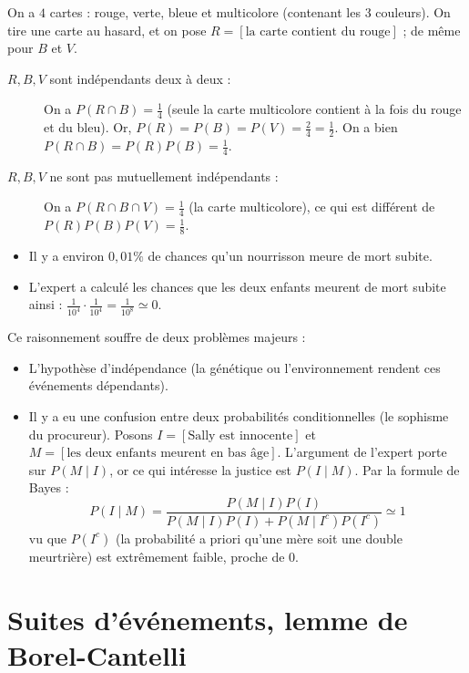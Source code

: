 \begin{exemple}
    On a $4$ cartes : rouge, verte, bleue et multicolore (contenant les 3 couleurs). On tire une carte au hasard, et on pose $R = [\text{la carte contient du rouge}]$ ; de même pour $B$ et $V$.
    \begin{description}
        \item[$R, B, V$ sont indépendants deux à deux :] On a $P(R\cap B) = \frac{1}{4}$ (seule la carte multicolore contient à la fois du rouge et du bleu). Or, $P(R) = P(B) = P(V) = \frac{2}{4} = \frac{1}{2}$. On a bien $P(R\cap B) = P(R)P(B) = \frac{1}{4}$.
        \item[$R, B, V$ ne sont pas mutuellement indépendants :] On a $P(R\cap B\cap V) = \frac{1}{4}$ (la carte multicolore), ce qui est différent de $P(R)P(B)P(V) = \frac{1}{8}$.
    \end{description}
\end{exemple}

\begin{exemple}
    \begin{itemize}
        \item Il y a environ $0{,}01\%$ de chances qu'un nourrisson meure de mort subite.
        \item L'expert a calculé les chances que les deux enfants meurent de mort subite ainsi : $\frac{1}{10^4} \cdot \frac{1}{10^4} = \frac{1}{10^8} \simeq 0$.
    \end{itemize}
    Ce raisonnement souffre de deux problèmes majeurs :
    \begin{itemize}
        \item L'hypothèse d'indépendance (la génétique ou l'environnement rendent ces événements dépendants).
        \item Il y a eu une confusion entre deux probabilités conditionnelles (le sophisme du procureur). Posons $I = [\text{Sally est innocente}]$ et $M = [\text{les deux enfants meurent en bas âge}]$. L'argument de l'expert porte sur $P(M\mid I)$, or ce qui intéresse la justice est $P(I\mid M)$. Par la formule de Bayes :
        \[
        P(I\mid M ) = \frac{P(M\mid I)P(I)}{P(M\mid I)P(I) + P(M\mid I^c)P(I^c)} \simeq 1
        \]
        vu que $P(I^c)$ (la probabilité a priori qu'une mère soit une double meurtrière) est extrêmement faible, proche de $0$.
    \end{itemize}
\end{exemple}

\section{Suites d'événements, lemme de Borel-Cantelli}

